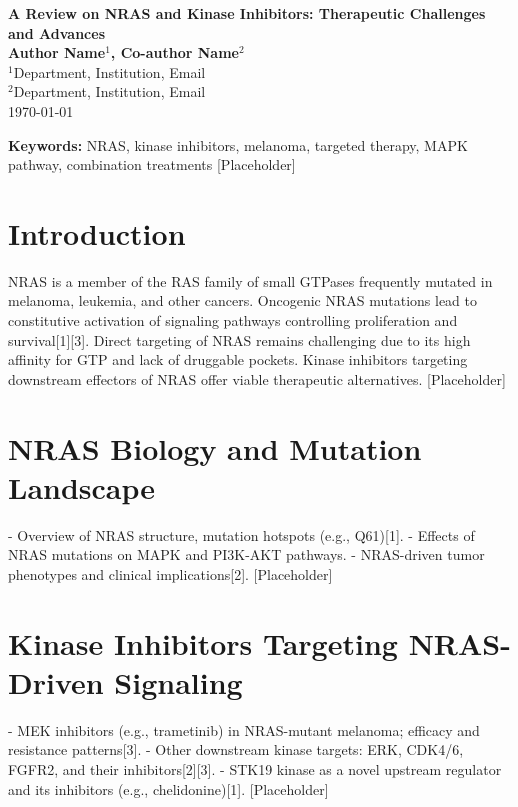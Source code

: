 \documentclass[12pt]{article}
\begin{document}
\begin{center}
    {\LARGE \textbf{A Review on NRAS and Kinase Inhibitors: Therapeutic Challenges and Advances}}\\[4pt]
    \textbf{Author Name$^{1}$, Co-author Name$^{2}$}\\
    $^{1}$Department, Institution, Email\\
    $^{2}$Department, Institution, Email\\
    \today
\end{center}

\begin{abstract}
NRAS mutations are key drivers in multiple aggressive cancers, notably melanoma. Despite NRAS being a challenging therapeutic target, recent advances in kinase inhibitors that modulate NRAS downstream signaling provide promising strategies for intervention. This review highlights the biology of NRAS mutations, current kinase inhibitor therapies, combination approaches, and future perspectives. [Placeholder]
\end{abstract}

\textbf{Keywords:} NRAS, kinase inhibitors, melanoma, targeted therapy, MAPK pathway, combination treatments [Placeholder]

\section*{Introduction}
NRAS is a member of the RAS family of small GTPases frequently mutated in melanoma, leukemia, and other cancers. Oncogenic NRAS mutations lead to constitutive activation of signaling pathways controlling proliferation and survival[1][3]. Direct targeting of NRAS remains challenging due to its high affinity for GTP and lack of druggable pockets. Kinase inhibitors targeting downstream effectors of NRAS offer viable therapeutic alternatives. [Placeholder]

\section*{NRAS Biology and Mutation Landscape}
- Overview of NRAS structure, mutation hotspots (e.g., Q61)[1].
- Effects of NRAS mutations on MAPK and PI3K-AKT pathways.
- NRAS-driven tumor phenotypes and clinical implications[2].
[Placeholder]

\section*{Kinase Inhibitors Targeting NRAS-Driven Signaling}
- MEK inhibitors (e.g., trametinib) in NRAS-mutant melanoma; efficacy and resistance patterns[3].
- Other downstream kinase targets: ERK, CDK4/6, FGFR2, and their inhibitors[2][3].
- STK19 kinase as a novel upstream regulator and its inhibitors (e.g., chelidonine)[1].
[Placeholder]
\end{document}

